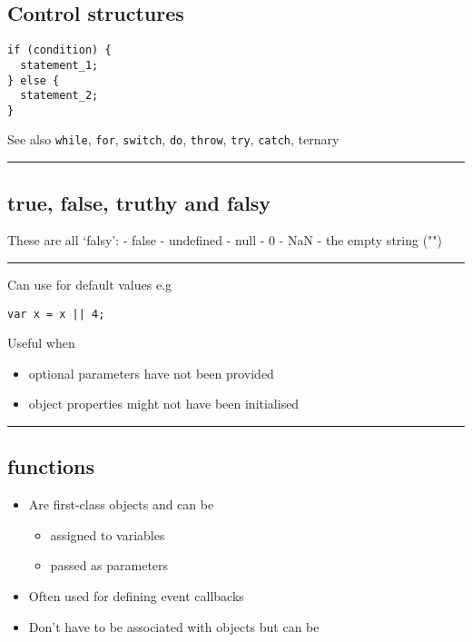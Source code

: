 \hypertarget{control-structures}{%
\subsection{Control structures}\label{control-structures}}

\begin{verbatim}
if (condition) {
  statement_1;
} else {
  statement_2;
}
\end{verbatim}

See also \texttt{while}, \texttt{for}, \texttt{switch}, \texttt{do},
\texttt{throw}, \texttt{try}, \texttt{catch}, ternary

\begin{center}\rule{0.5\linewidth}{\linethickness}\end{center}

\hypertarget{true-false-truthy-and-falsy}{%
\subsection{true, false, truthy and
falsy}\label{true-false-truthy-and-falsy}}

These are all `falsy': - false - undefined - null - 0 - NaN - the empty
string ("")

\begin{center}\rule{0.5\linewidth}{\linethickness}\end{center}

Can use for default values e.g

\begin{verbatim}
var x = x || 4;
\end{verbatim}

Useful when

\begin{itemize}
\tightlist
\item
  optional parameters have not been provided
\item
  object properties might not have been initialised
\end{itemize}

\begin{center}\rule{0.5\linewidth}{\linethickness}\end{center}

\hypertarget{functions}{%
\subsection{functions}\label{functions}}

\begin{itemize}
\tightlist
\item
  Are first-class objects and can be

  \begin{itemize}
  \tightlist
  \item
    assigned to variables
  \item
    passed as parameters
  \end{itemize}
\item
  Often used for defining event callbacks
\item
  Don't have to be associated with objects but can be
\end{itemize}

